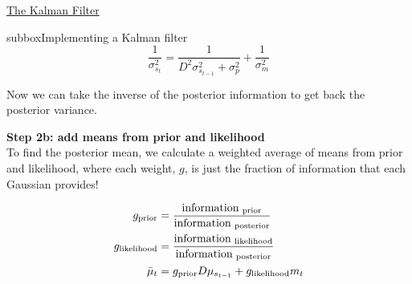 \begin{textbox}{\href{http://instructor.compneuro.neuromatch.io/tutorials/W3D2_HiddenDynamics/instructor/W3D2_Tutorial3.html}{The Kalman Filter }   }
\begin{subbox}{subbox}{Implementing a Kalman filter}
\begin{equation}
\frac{1}{\sigma_{s_t}^2} = \frac{1}{D^2\sigma_{s_{t-1}}^2 +\sigma_p^2} + \frac{1}{\sigma_m^2}
\end{equation}

Now we can take the inverse of the posterior information to get back the posterior variance.

\textbf{Step 2b: add means from prior and likelihood}\\ 

To find the posterior mean, we calculate a weighted average of means from prior and likelihood, where each weight, $g$, is just the fraction of information that each Gaussian provides!

\begin{align}
g_{\rm{prior}} &= \frac{\rm{information}_{\textit{ }\rm{prior}}}{\rm{information}_{\textit{ }\rm{posterior}}} \\
g_{\rm{likelihood}} &= \frac{\rm{information}_{\textit{ }\rm{likelihood}}}{\rm{information}_{\textit{ }\rm{posterior}}} \\
\bar{\mu}_t &= g_{\rm{prior}} D\mu_{s_{t-1}} + g_{\rm{likelihood}} m_t
\end{align}
\end{subbox}

\end{textbox}
